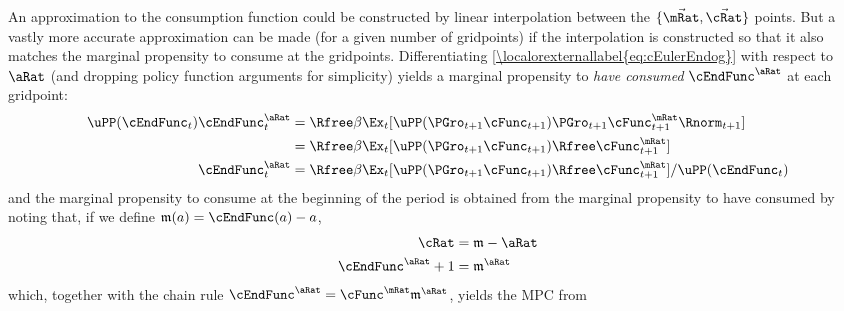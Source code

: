 \documentclass[\econtexRoot/BufferStockTheory]{subfiles}
\begin{document}
An approximation to the consumption function could be constructed by
linear interpolation between the $\{\vec{\mRat},\vec{\cRat}\}$ points.
But a vastly more accurate approximation can be made (for a given
number of gridpoints) if the interpolation is constructed so that it
also matches the marginal propensity to consume at the gridpoints. Differentiating \eqref{\localorexternallabel{eq:cEulerEndog}}
with respect to $\aRat$ (and dropping policy function arguments for
simplicity) yields a marginal propensity to {\it have consumed} $\cEndFunc^{\aRat}$ at
each gridpoint:
\begin{align}
\uPP(\cEndFunc_{t})\cEndFunc_{t}^{\aRat}  & = \Rfree \beta \Ex_{t}[\uPP(\PGro_{t+1} \cFunc_{t+1})\PGro_{t+1} \cFunc^{\mRat}_{t+1}\Rnorm_{t+1}] \notag
\\  & = \Rfree \beta \Ex_{t}[\uPP(\PGro_{t+1} \cFunc_{t+1}) \Rfree \cFunc^{\mRat}_{t+1}] \notag
\\ \cEndFunc_{t}^{\aRat}  & = \Rfree \beta \Ex_{t}[\uPP(\PGro_{t+1}  \cFunc_{t+1}) \Rfree \cFunc^{\mRat}_{t+1}]/\uPP(\cEndFunc_{t}) \label{eq:MPTHC}
\end{align}
and the marginal propensity to consume at the beginning of the period is obtained from the marginal
propensity to have consumed by noting that, if we define $\mathfrak{m}(a) = \cEndFunc(a)-a$,
\begin{align*}
   \cRat  & = \mathfrak{m}-\aRat
\\ \cEndFunc^{\aRat}+1  & = \mathfrak{m}^{\aRat}
\end{align*}
which, together with the chain rule $\cEndFunc^{\aRat}  = \cFunc^{\mRat}\mathfrak{m}^{\aRat}$,
yields the MPC from
\end{document}
